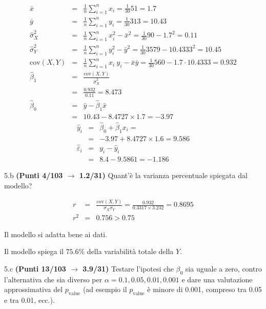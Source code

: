 \documentclass[
  11pt,
]{book}
\theoremstyle{mytheoremstyle}
\theoremstyle{mydefstyle}
\newenvironment{sol}
  {
  \begin{tcolorbox}[enhanced,breakable,arc=0.1mm,boxrule=1pt,colback=white,colframe=iblue,
  title=\bf \fontfamily{lmss}\selectfont \hspace{.5 cm} Soluzione,drop fuzzy shadow]

}{
\end{tcolorbox}
  }
\begin{document}
\begin{sol}
\begin{eqnarray*}
           \bar x &=&\frac 1 n\sum_{i=1}^n x_i = \frac {1}{ 30 }  51 =  1.7 \\
           \bar y &=&\frac 1 n\sum_{i=1}^n y_i = \frac {1}{ 30 }  313 =  10.43 \\
           \hat\sigma_X^2&=&\frac 1 n\sum_{i=1}^n x_i^2-\bar x^2=\frac {1}{ 30 }  90  - 1.7 ^2= 0.11 \\
           \hat\sigma_Y^2&=&\frac 1 n\sum_{i=1}^n y_i^2-\bar y^2=\frac {1}{ 30 }  3579  - 10.4333 ^2= 10.45 \\
           \text{cov}(X,Y)&=&\frac 1 n\sum_{i=1}^n x_i~y_i-\bar x\bar y=\frac {1}{ 30 }  560 - 1.7 \cdot 10.4333 = 0.932 \\
           \hat\beta_1 &=& \frac{\text{cov}(X,Y)}{\hat\sigma_X^2} \\
                    &=& \frac{ 0.932 }{ 0.11 }  =  8.473 \\
           \hat\beta_0 &=& \bar y - \hat\beta_1 \bar x\\
                    &=&  10.43 - 8.4727 \times  1.7 = -3.97 
         \end{eqnarray*}\begin{eqnarray*}
\hat y_i &=&\hat\beta_0+\hat\beta_1 x_i=\\ 
&=& -3.97 + 8.4727 \times 1.6 = 9.586 \\ 
\hat \varepsilon_i &=& y_i-\hat y_i\\ 
&=& 8.4 - 9.5861 = -1.186  
\end{eqnarray*}

\end{sol}

5.b \textbf{(Punti 4/103 \(\rightarrow\) 1.2/31)} Quant'è la varianza percentuale spiegata dal modello?

\begin{sol}
\begin{eqnarray*}
r&=&\frac{\text{cov}(X,Y)}{\sigma_X\sigma_Y}=\frac{ 0.932 }{ 0.3317 \times 3.232 }= 0.8695 \\ 
r^2&=& 0.756 > 0.75
\end{eqnarray*}

Il modello si adatta bene ai dati.

Il modello spiega il \(75.6\%\) della variabilità totale della \(Y\).

\end{sol}

5.c \textbf{(Punti 13/103 \(\rightarrow\) 3.9/31)} Testare l'ipotesi che \(\beta_0\) sia uguale a zero, contro l'alternativa che sia diverso per \(\alpha=0.1,0.05,0.01,0.001\) e dare una valutazione approssimativa del \(p_\text{value}\) (ad esempio il \(p_\text{value}\) è minore di 0.001, compreso tra 0.05 e tra 0.01, ecc.).
\end{document}
